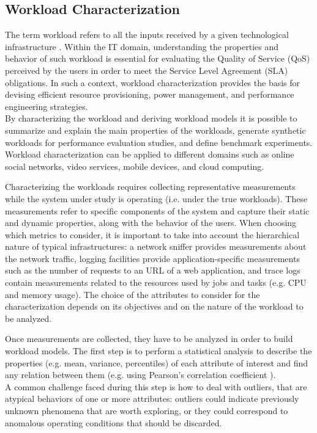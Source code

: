 \documentclass[a4paper, 12pt]{article} %
\begin{document}
	\subsection{Workload Characterization} \label{ssec:workload_characterization}
	The term workload refers to all the inputs received by a given technological infrastructure \cite{WorkloadCharacterization}. Within the IT domain, understanding the properties and behavior of such workload is essential for evaluating the Quality of Service (QoS) perceived by the users in order to meet the Service Level Agreement (SLA) obligations. In such a context, workload characterization provides the basis for devising efficient resource provisioning, power management, and performance engineering strategies.\\
	By characterizing the workload and deriving workload models it is possible to summarize and explain the main properties of the workloads, generate synthetic workloads for performance evaluation studies, and define benchmark experiments. Workload characterization can be applied to different domains such as online social networks, video services, mobile devices, and cloud computing.
	
	Characterizing the workloads requires collecting representative measurements while the system under study is operating (i.e. under the true workloads). These measurements refer to specific components of the system and capture their static and dynamic properties, along with the behavior of the users. When choosing which metrics to consider, it is important to take into account the hierarchical nature of typical infrastructures: a network sniffer provides measurements about the network traffic, logging facilities provide application-specific measurements such as the number of requests to an URL of a web application, and trace logs contain measurements related to the resources used by jobs and tasks (e.g. CPU and memory usage). The choice of the attributes to consider for the characterization depends on its objectives and on the nature of the workload to be analyzed.
	
	Once measurements are collected, they have to be analyzed in order to build workload models. The first step is to perform a statistical analysis to describe the properties (e.g. mean, variance, percentiles) of each attribute of interest and find any relation between them (e.g. using Pearson's correlation coefficient \cite{PearsonCoefficient}). \\
	A common challenge faced during this step is how to deal with outliers, that are atypical behaviors of one or more attributes: outliers could indicate previously unknown phenomena that are worth exploring, or they could correspond to anomalous operating conditions that should be discarded.
	
\end{document}
